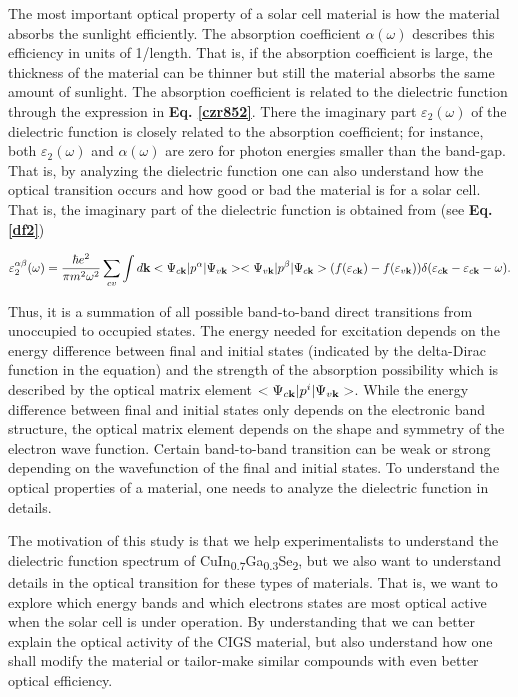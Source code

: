 \documentclass[a4paper, 12pt, titlepage,oneside,drop]{kthesis}
\begin{document}
The most important optical property of a solar cell material is how the material absorbs the sunlight efficiently. The absorption coefficient $\alpha(\omega)$ describes this efficiency in units of 1/length.
That is, if the absorption coefficient is large, the thickness of the material can be thinner but still the material absorbs the same amount of sunlight. The absorption coefficient is related to the dielectric function through
the expression in \textbf{Eq. \ref{czr852}}. There the imaginary part $\varepsilon_2(\omega)$ of the dielectric function is closely related to the absorption coefficient; for instance, 
both $\varepsilon_2(\omega)$ and $\alpha(\omega)$ are zero for photon energies smaller than the band-gap.  That is, by analyzing the dielectric function one can also understand how the optical transition occurs and
how good or bad the material is for a solar cell. That is, the imaginary part of the dielectric function is obtained from (see \textbf{Eq. \ref{df2}})

\begin{equation}
\varepsilon_2^{\alpha\beta} (\omega)= \frac{\hbar e^2}{\pi m^2\omega^2} \sum_{cv} \int d \textbf {k} <\Psi_{c{\textbf k}}|p^\alpha|\Psi_{v{\textbf k}}><\Psi_{v{\textbf k}}|p^\beta|\Psi_{c{\textbf k}}> (f(\varepsilon_{c \textbf k})-f(\varepsilon_{v \textbf k}))\delta(\varepsilon_{c {\textbf k}}-\varepsilon_{c{\textbf k}}-\omega).
\end{equation}

Thus, it is a summation of all possible band-to-band direct transitions from unoccupied to occupied states. The energy needed for excitation depends on the energy difference between final and initial states (indicated by the 
delta-Dirac function in the equation) and the strength of the absorption possibility which is described by the 
optical matrix element $<\Psi_{c{\textbf k}}|p^i|\Psi_{v{\textbf k}}>$. While the energy difference between final and initial states only depends on the electronic band structure, the optical matrix element depends
on the shape and symmetry of the electron wave function. Certain band-to-band transition can be weak or strong depending on the wavefunction of the final and initial states. To understand the optical properties of a material, 
one needs to analyze the dielectric function in details.  

 
\noindent The motivation of this study is that we help experimentalists to understand the dielectric function spectrum 
of CuIn\textsubscript{0.7}Ga\textsubscript{0.3}Se\textsubscript{2}, but we also want to understand details in the optical transition for these types of materials. That is, we want to explore which energy bands and which electrons states are 
most optical active when the solar cell is under operation. 
By understanding that we can better explain the optical activity of the CIGS material, but also understand how one shall modify the material or tailor-make similar compounds with even better optical efficiency.   
\end{document}
